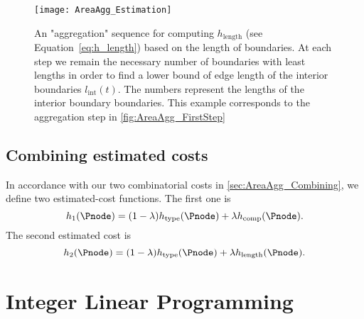 


\begin{figure*}[htb]
	\centering
	\texttt{[image: AreaAgg\_Estimation]}
	\caption{An "aggregation" sequence for computing 
		$h_\mathrm{length}$ 
		(see Equation~\ref{eq:h_length}) 
		based on the length of boundaries. 
		At each step we remain the necessary number 
		of boundaries with least lengths in order to find a 
		lower bound of edge length of the interior boundaries 
		$l_\mathrm{int}(t)$. 
		The numbers represent the 
		lengths of the interior boundary boundaries.
		This example corresponds to the aggregation step in 
		\fig\ref{fig:AreaAgg_FirstStep}
	}
	\label{fig:AreaAgg_h_length}
\end{figure*}


\subsection{Combining estimated costs}
\label{sec:AreaAgg_CombinationEstimated}
In accordance 
with our two combinatorial costs in 
\sect\ref{sec:AreaAgg_Combining},
we define two estimated-cost functions.
The first one is 
\begin{equation}
\label{eq:h_1}
h_1(\Pnode)=
(1-\lambda)h_\mathrm{type}(\Pnode)
+\lambda h_{\mathrm{comp}}(\Pnode).
\end{equation}
The second estimated cost is
\begin{equation}
\label{eq:h_2}
h_2(\Pnode)=
(1-\lambda)h_\mathrm{type}(\Pnode)
+\lambda h_{\mathrm{length}}(\Pnode).
\end{equation}





\section{Integer Linear Programming}
\label{sec:AreaAgg_ILP}

